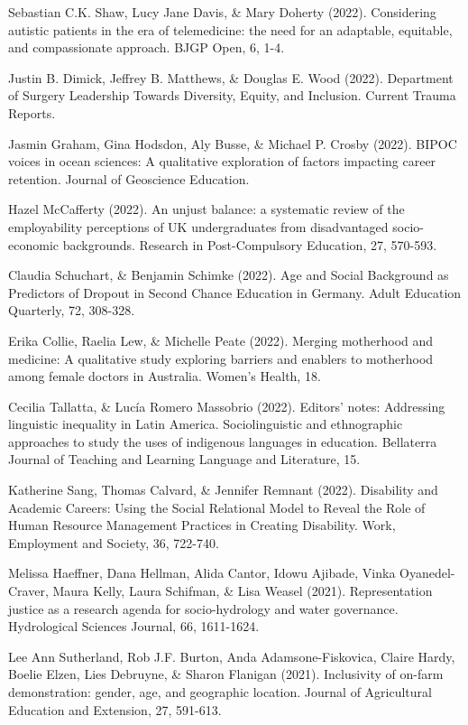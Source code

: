 \documentclass[runningheads]{llncs}
\begin{document}
\begin{multicols}{2}
Sebastian C.K. Shaw, Lucy Jane Davis, \& Mary Doherty (2022). Considering autistic patients in the era of telemedicine: the need for an adaptable, equitable, and compassionate approach. BJGP Open, 6, 1-4.

Justin B. Dimick, Jeffrey B. Matthews, \& Douglas E. Wood (2022). Department of Surgery Leadership Towards Diversity, Equity, and Inclusion. Current Trauma Reports.

Jasmin Graham, Gina Hodsdon, Aly Busse, \& Michael P. Crosby (2022). BIPOC voices in ocean sciences: A qualitative exploration of factors impacting career retention. Journal of Geoscience Education.

Hazel McCafferty (2022). An unjust balance: a systematic review of the employability perceptions of UK undergraduates from disadvantaged socio-economic backgrounds. Research in Post-Compulsory Education, 27, 570-593.

Claudia Schuchart, \& Benjamin Schimke (2022). Age and Social Background as Predictors of Dropout in Second Chance Education in Germany. Adult Education Quarterly, 72, 308-328.

Erika Collie, Raelia Lew, \& Michelle Peate (2022). Merging motherhood and medicine: A qualitative study exploring barriers and enablers to motherhood among female doctors in Australia. Women's Health, 18.

Cecilia Tallatta, \& Lucía Romero Massobrio (2022). Editors' notes: Addressing linguistic inequality in Latin America. Sociolinguistic and ethnographic approaches to study the uses of indigenous languages in education. Bellaterra Journal of Teaching and Learning Language and Literature, 15.

Katherine Sang, Thomas Calvard, \& Jennifer Remnant (2022). Disability and Academic Careers: Using the Social Relational Model to Reveal the Role of Human Resource Management Practices in Creating Disability. Work, Employment and Society, 36, 722-740.

Melissa Haeffner, Dana Hellman, Alida Cantor, Idowu Ajibade, Vinka Oyanedel-Craver, Maura Kelly, Laura Schifman, \& Lisa Weasel (2021). Representation justice as a research agenda for socio-hydrology and water governance. Hydrological Sciences Journal, 66, 1611-1624.

Lee Ann Sutherland, Rob J.F. Burton, Anda Adamsone-Fiskovica, Claire Hardy, Boelie Elzen, Lies Debruyne, \& Sharon Flanigan (2021). Inclusivity of on-farm demonstration: gender, age, and geographic location. Journal of Agricultural Education and Extension, 27, 591-613.


\end{multicols}
\end{document}
